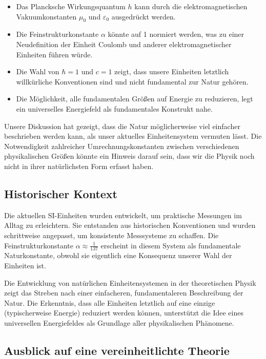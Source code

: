 \documentclass{article}
\begin{document}
	\begin{itemize}
		\item Das Plancksche Wirkungsquantum $h$ kann durch die elektromagnetischen Vakuumkonstanten $\mu_0$ und $\varepsilon_0$ ausgedrückt werden.
		\item Die Feinstrukturkonstante $\alpha$ könnte auf 1 normiert werden, was zu einer Neudefinition der Einheit Coulomb und anderer elektromagnetischer Einheiten führen würde.
		\item Die Wahl von $\hbar = 1$ und $c = 1$ zeigt, dass unsere Einheiten letztlich willkürliche Konventionen sind und nicht fundamental zur Natur gehören.
		\item Die Möglichkeit, alle fundamentalen Größen auf Energie zu reduzieren, legt ein universelles Energiefeld als fundamentales Konstrukt nahe.
	\end{itemize}
	
	Unsere Diskussion hat gezeigt, dass die Natur möglicherweise viel einfacher beschrieben werden kann, als unser aktuelles Einheitensystem vermuten lässt. Die Notwendigkeit zahlreicher Umrechnungskonstanten zwischen verschiedenen physikalischen Größen könnte ein Hinweis darauf sein, dass wir die Physik noch nicht in ihrer natürlichsten Form erfasst haben.
	
	\subsection{Historischer Kontext}
	
	Die aktuellen SI-Einheiten wurden entwickelt, um praktische Messungen im Alltag zu erleichtern. Sie entstanden aus historischen Konventionen und wurden schrittweise angepasst, um konsistente Messsysteme zu schaffen. Die Feinstrukturkonstante $\alpha \approx \frac{1}{137}$ erscheint in diesem System als fundamentale Naturkonstante, obwohl sie eigentlich eine Konsequenz unserer Wahl der Einheiten ist.
	
	Die Entwicklung von natürlichen Einheitensystemen in der theoretischen Physik zeigt das Streben nach einer einfacheren, fundamentaleren Beschreibung der Natur. Die Erkenntnis, dass alle Einheiten letztlich auf eine einzige (typischerweise Energie) reduziert werden können, unterstützt die Idee eines universellen Energiefeldes als Grundlage aller physikalischen Phänomene.
	
	\subsection{Ausblick auf eine vereinheitlichte Theorie}
	
\end{document}
